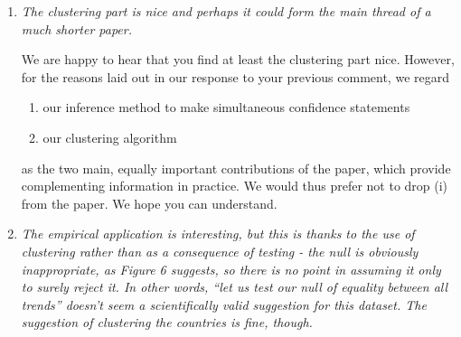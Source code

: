 \documentclass[a4paper,12pt]{article}
\begin{document}
\begin{enumerate}[label=\arabic*.,leftmargin=0.6cm]


\item {\color{black}\textit{The clustering part is nice and perhaps it could form the main thread of a much shorter paper.}  }

We are happy to hear that you find at least the clustering part nice. However, for the reasons laid out in our response to your previous comment, we regard
\begin{enumerate}[label=(\roman*),itemsep=0pt,topsep=0pt,leftmargin=1.5cm]
\item our inference method to make simultaneous confidence statements 
\item our clustering algorithm 
\end{enumerate}
as the two main, equally important contributions of the paper, which provide complementing information in practice. We would thus prefer not to drop (i) from the paper. We hope you can understand. 


\item {\color{black}\textit{The empirical application is interesting, but this is thanks to the use of clustering rather than as a consequence of testing - the null is obviously inappropriate, as Figure 6 suggests, so there is no point in assuming it only to surely reject it. In other words, “let us test our null of equality between all trends” doesn’t seem a scientifically valid suggestion for this dataset. The suggestion of clustering the countries is fine, though.}}


\end{enumerate}
\end{document}
